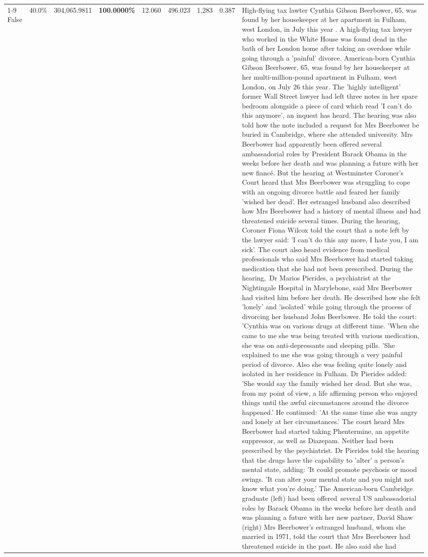 \begin{table}[H]
\begin{tabular}{lllrlllll}
\cline{1-9}
False & 40.0\% & \color{red} 304,065.9811 & \bfseries \color{red} 100.0000\% & 12.060 & 496.023 & 1,283 & 0.387 & High-flying tax lawter Cynthia Gibson Beerbower, 65, was found by her housekeeper at her apartment in Fulham, west London, in July this year . A high-flying tax lawyer who worked in the White House was found dead in the bath of her London home after taking an overdose while going through a 'painful' divorce. American-born Cynthia Gibson Beerbower, 65, was found by her housekeeper at her multi-million-pound apartment in Fulham, west London, on July 26 this year. The 'highly intelligent' former Wall Street lawyer had left three notes in her spare bedroom alongside a piece of card which read 'I can't do this anymore', an inquest has heard. The hearing was also told how the note included a request for Mrs Beerbower be buried in Cambridge, where she attended university. Mrs Beerbower had apparently been offered several ambassadorial roles by President Barack Obama in the weeks before her death and was planning a future with her new fiancé. But the hearing at Westminster Coroner's Court heard that Mrs Beerbower was struggling to cope with an ongoing divorce battle and feared her family 'wished her dead'. Her estranged husband also described how Mrs Beerbower had a history of mental illness and had threatened suicide several times. During the hearing, Coroner Fiona Wilcox told the court that a note left by the lawyer said: 'I can't do this any more, I hate you, I am sick'. The court also heard evidence from medical professionals who said Mrs Beerbower had started taking medication that she had not been prescribed. During the hearing, Dr Marios Pierides, a psychiatrist at the Nightingale Hospital in Marylebone, said Mrs Beerbower had visited him before her death. He described how she felt 'lonely' and 'isolated' while going through the process of divorcing her husband John Beerbower. He told the court: 'Cynthia was on various drugs at different time. 'When she came to me she was being treated with various medication, she was on anti-depressants and sleeping pills. 'She explained to me she was going through a very painful period of divorce. Also she was feeling quite lonely and isolated in her residence in Fulham. Dr Pierides added: 'She would say the family wished her dead. But she was, from my point of view, a life affirming person who enjoyed things until the awful circumstances around the divorce happened.' He continued: 'At the same time she was angry and lonely at her circumstances.' The court heard Mrs Beerbower had started taking Phentermine, an appetite suppressor, as well as Diazepam. Neither had been prescribed by the psychiatrist. Dr Pierides told the hearing that the drugs have the capability to 'alter' a person's mental state, adding: 'It could promote psychosis or mood swings. 'It can alter your mental state and you might not know what you're doing.' The American-born Cambridge graduate (left) had been offered several US ambassadorial roles by Barack Obama in the weeks before her death and was planning a future with her new partner, David Shaw (right) Mrs Beerbower's estranged husband, whom she married in 1971, told the court that Mrs Beerbower had threatened suicide in the past. He also said she had 
\end{tabular}
\end{table}
